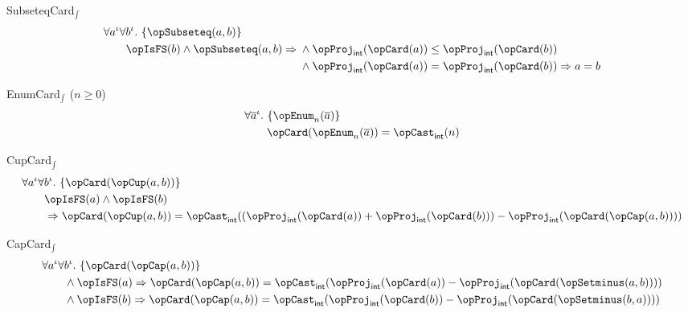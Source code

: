 \documentclass[11pt, a4paper, oneside]{article}
\begin{document}
\begin{axioms}
\item[SubseteqCard$_\int$] \[
        \begin{aligned}
            &\forall a^\idv \forall b^\idv.\, \st{ \opSubseteq(a, b) } \\
            &\qquad \opIsFS(b) \wedge \opSubseteq(a, b) \imp \begin{aligned}[t]
                &\wedge \opProj_\int(\opCard(a)) \le \opProj_\int(\opCard(b)) \\
                &\wedge \opProj_\int(\opCard(a)) = \opProj_\int(\opCard(b)) \imp a = b
            \end{aligned}
        \end{aligned}
    \]

\item[EnumCard$_\int$ ($n \ge 0$)] \[
        \begin{aligned}
            &\forall \overline{a}^\idv.\, \st{ \opEnum_n(\overline{a}) } \\
            &\qquad \opCard(\opEnum_n(\overline{a})) = \opCast_\int(n)
        \end{aligned}
    \]

\item[CupCard$_\int$] \[
        \begin{aligned}
            &\forall a^\idv \forall b^\idv.\, \st{ \opCard(\opCup(a, b)) } \\
            &\qquad \opIsFS(a) \wedge \opIsFS(b) \\
            &\qquad \imp \opCard(\opCup(a, b)) = \opCast_\int((\opProj_\int(\opCard(a)) + \opProj_\int(\opCard(b))) - \opProj_\int(\opCard(\opCap(a, b))))
        \end{aligned}
    \]

\item[CapCard$_\int$] \[
        \begin{aligned}
            &\forall a^\idv \forall b^\idv.\, \st{ \opCard(\opCap(a, b)) } \\
            &\qquad \begin{aligned}[t]
                &\wedge \opIsFS(a) \imp \opCard(\opCap(a, b)) = \opCast_\int(\opProj_\int(\opCard(a)) - \opProj_\int(\opCard(\opSetminus(a, b)))) \\
                &\wedge \opIsFS(b) \imp \opCard(\opCap(a, b)) = \opCast_\int(\opProj_\int(\opCard(b)) - \opProj_\int(\opCard(\opSetminus(b, a))))
            \end{aligned}
        \end{aligned}
    \]


\end{axioms}
\end{document}
